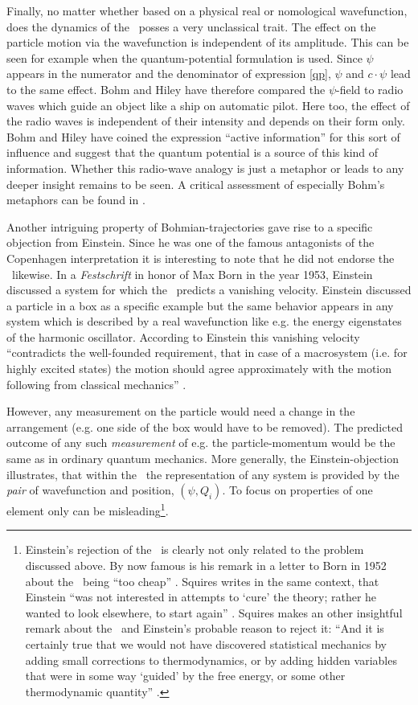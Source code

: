 Finally, no matter whether based on a physical real or nomological wavefunction, does the dynamics of the \dbb\
posses a very unclassical trait. The effect on the particle motion via the wavefunction is independent of its amplitude. This 
can be seen for example when the quantum-potential formulation is 
used. Since $\psi$ appears in the numerator and the denominator of expression \ref{qp}, $\psi$ and $c \cdot \psi$ lead to the 
same effect. Bohm and Hiley have therefore compared the $\psi$-field to radio waves which 
guide an object like a ship on automatic pilot. Here too, the effect of the 
radio waves is independent of their intensity and depends on their form \cite{bh} only. 
Bohm and Hiley have coined the expression ``active information'' for this sort of 
influence and suggest that the quantum potential is a source of this kind of information.
Whether this radio-wave analogy is just a metaphor or leads to any deeper insight  remains to be seen. 
A critical assessment of especially Bohm's metaphors can be found in \cite{guarini}.

Another intriguing property of Bohmian-trajectories gave rise to a specific
objection from Einstein. Since he was one of the famous antagonists of the Copenhagen 
interpretation it is interesting to note that he did not endorse the \dbb\ likewise. 
In a {\em Festschrift} in honor of Max Born in the year 1953, Einstein discussed a system for which 
the \dbb\ predicts a vanishing velocity. Einstein discussed a particle in a 
box as a specific example but the same behavior appears in any system which is described by 
a real wavefunction like e.g. the energy eigenstates of the 
harmonic oscillator. According to Einstein this vanishing velocity  ``contradicts the well-founded 
requirement, that in case of a macrosystem (i.e. for highly excited states) the motion should agree approximately with 
the motion following from classical mechanics'' \cite{early}. 

However, any measurement on the particle  would need a change in the arrangement (e.g. one side of the box would have to be removed). 
The predicted outcome of any such {\em measurement} of e.g. the particle-momentum would be the same as in ordinary quantum mechanics. 
More generally, the Einstein-objection illustrates, that within the \dbb\ the representation of any system is provided by the 
{\em pair} of wavefunction and position, $(\psi,Q_i)$. To focus on properties of one element only can be misleading\footnote{Einstein's
rejection of the \dbb\ is 
clearly not only related to the problem discussed above.  By now famous is his remark in a letter to Born in 1952 about 
the \dbb\ being ``too cheap'' \cite[letter from 12.5.1952]{bornbriefwechsel}. Squires writes in the same context, that 
Einstein ``was not interested in attempts to `cure' the theory; rather he wanted to look elsewhere, to start 
again'' \cite{squires2}. Squires makes an other insightful remark about the \dbb\ and Einstein's probable reason to reject 
it: ``And it is certainly true that we would not have discovered statistical mechanics by adding small corrections to 
thermodynamics, or by adding hidden variables that were in some way `guided' by the free energy, or some other thermodynamic 
quantity'' \cite{squires2}.}.   

